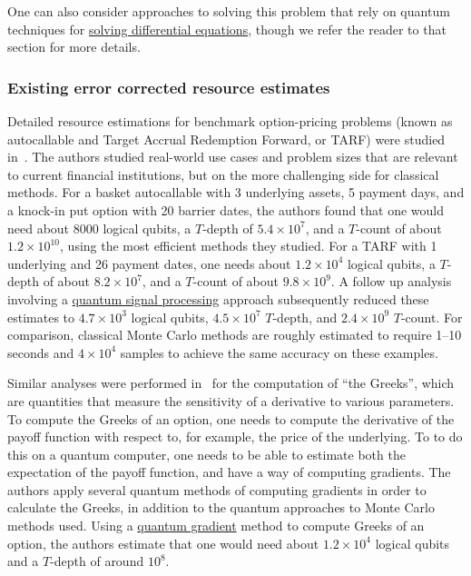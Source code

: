 \begin{refsection}
One can also consider approaches to solving this problem that rely on quantum techniques for \hyperref[appl:DiffEq]{solving differential equations}, though we refer the reader to that section for more details.


\subsubsection*{Existing error corrected resource estimates}

Detailed resource estimations for benchmark option-pricing problems (known as autocallable and Target Accrual Redemption Forward, or TARF) were studied in~\cite{chakrabarti2021threshold}. The authors studied real-world use cases and problem sizes that are relevant to current financial institutions, but on the more challenging side for classical methods. For a basket autocallable with 3 underlying assets, 5 payment days, and a knock-in put option with 20 barrier dates, the authors found that one would need about $8000$ logical qubits, a $T$-depth of $5.4\times 10^7$, and a $T$-count of about $1.2\times 10^{10}$, using the most efficient methods they studied. For a TARF with 1 underlying and 26 payment dates, one needs about $1.2 \times 10^4$ logical qubits, a $T$-depth of about $8.2\times 10^7$, and a $T$-count of about $9.8\times 10^9$. A follow up analysis \cite{stamatopoulos2023derivativeQSP} involving a \hyperref[prim:QSP]{quantum signal processing} approach subsequently reduced these estimates to $4.7 \times 10^3$ logical qubits, $4.5 \times 10^7$ $T$-depth, and $2.4 \times 10^9$ $T$-count. For comparison, classical Monte Carlo methods are roughly estimated to require 1--10 seconds and $4 \times 10^4$ samples to achieve the same accuracy on these examples.

Similar analyses were performed in~\cite{stamatopoulos2022towards} for the computation of ``the Greeks'', which are quantities that measure the sensitivity of a derivative to various parameters. To compute the Greeks of an option, one needs to compute the derivative of the payoff function with respect to, for example, the price of the underlying. To to do this on a quantum computer, one needs to be able to estimate both the expectation of the payoff function, and have a way of computing gradients. The authors apply several quantum methods of computing gradients in order to calculate the Greeks, in addition to the quantum approaches to Monte Carlo methods used. Using a \hyperref[prim:GradientEstimation]{quantum gradient} method to compute Greeks of an option, the authors estimate that one would need about $1.2 \times 10^4$ logical qubits and a $T$-depth of around $10^8$.



\end{refsection}
